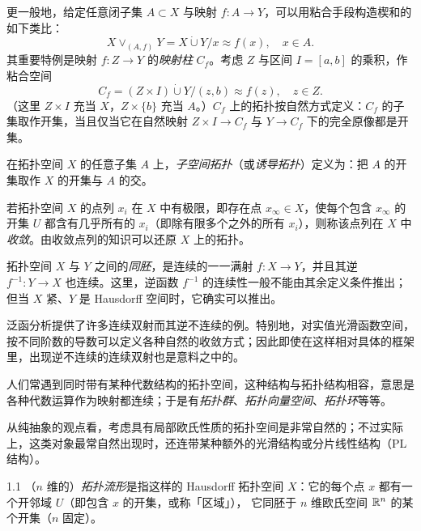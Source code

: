 更一般地，给定任意闭子集 $A\subset X$ 与映射 $f:A\to Y$，可以用粘合手段构造楔和的如下类比：
\[
  X\vee_{(A,f)}Y=X\dot\cup Y/x\approx f(x),\quad x\in A.
\]
其重要特例是映射 $f:Z\to Y$ 的\emph{映射柱} $C_f$。考虑 $Z$ 与区间 $I=[a,b]$ 的乘积，作粘合空间
\begin{equation}
  C_f=(Z\times I)\dot\cup Y/(z,b)\approx f(z),\quad z\in Z. \tag{1.2}
\end{equation}
（这里 $Z\times I$ 充当 $X$，$Z\times\{b\}$ 充当 $A$。）$C_f$ 上的拓扑按自然方式定义：$C_f$ 的子集取作开集，当且仅当它在自然映射 $Z\times I\to C_f$ 与 $Y\to C_f$ 下的完全原像都是开集。

在拓扑空间 $X$ 的任意子集 $A$ 上，\emph{子空间拓扑}（或\emph{诱导拓扑}）定义为：把 $A$ 的开集取作 $X$ 的开集与 $A$ 的交。

若拓扑空间 $X$ 的点列 $x_i$ 在 $X$ 中有极限，即存在点 $x_\infty\in X$，使每个包含 $x_\infty$ 的开集 $U$ 都含有几乎所有的 $x_i$（即除有限多个之外的所有 $x_i$），则称该点列在 $X$ 中\emph{收敛}。由收敛点列的知识可以还原 $X$ 上的拓扑。

拓扑空间 $X$ 与 $Y$ 之间的\emph{同胚}，是连续的一一满射 $f:X\to Y$，并且其逆 $f^{-1}:Y\to X$ 也连续。这里，逆函数 $f^{-1}$ 的连续性一般不能由其余定义条件推出；但当 $X$ 紧、$Y$ 是 Hausdorff 空间时，它确实可以推出。

泛函分析提供了许多连续双射而其逆不连续的例。特别地，对实值光滑函数空间，按不同阶数的导数可以定义各种自然的收敛方式；因此即使在这样相对具体的框架里，出现逆不连续的连续双射也是意料之中的。

人们常遇到同时带有某种代数结构的拓扑空间，这种结构与拓扑结构相容，意思是各种代数运算作为映射都连续；于是有\emph{拓扑群}、\emph{拓扑向量空间}、\emph{拓扑环}等等。

从纯抽象的观点看，考虑具有局部欧氏性质的拓扑空间是非常自然的；不过实际上，这类对象最常自然出现时，还连带某种额外的光滑结构或分片线性结构（PL 结构）。

\begin{definition*}{1.1}
（$n$ 维的）\emph{拓扑流形}是指这样的 Hausdorff 拓扑空间 $X$：它的每个点 $x$ 都有一个开邻域 $U$（即包含 $x$ 的开集，或称「区域」），
它同胚于 $n$ 维欧氏空间 $\mathbb{R}^n$ 的某个开集（$n$ 固定）。
\end{definition*}

